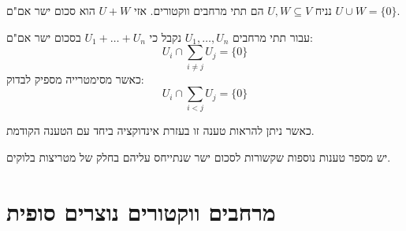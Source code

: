 \documentclass{tstextbook}
\begin{document}
\begin{proposition}
נניח \(U,W \subseteq V\) הם תתי מרחבים ווקטורים. אזי \(U+W\) הוא סכום ישר אם"ם \(U\cup W=\{ 0 \}\).

\end{proposition}
\begin{corollary}
עבור תתי מרחבים \(U_{1},\dots,U_{n}\) נקבל כי \(U_{1}+\dots+U_{n}\) בסכום ישר אם"ם:
$$U_{i}\cap\sum_{i\neq j}U_{j}=\{ 0 \}$$
כאשר מסימטרייה מספיק לבדוק:
$$ U_{i}\cap\sum_{i<j}U_{j}=\{ 0 \}$$

\end{corollary}
כאשר ניתן להראות טענה זו בעזרת אינדוקציה ביחד עם הטענה הקודמת.

\begin{remark}
יש מספר טענות נוספות שקשורות לסכום ישר שנתייחס עליהם בחלק של מטריצות בלוקים.

\end{remark}
\section{מרחבים ווקטורים נוצרים סופית}
\end{document}
